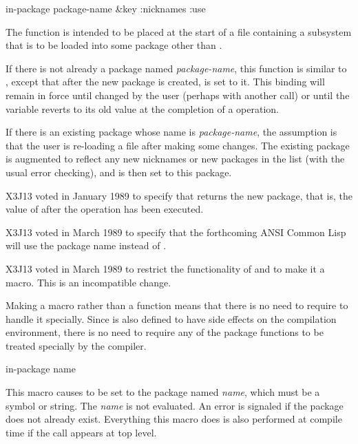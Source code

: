 \begin{obsolete}
\begin{defun}[Function]
in-package package-name &key :nicknames :use

The  function is intended to be placed at the start of a
file containing a subsystem that is to be loaded into some package other
than .

If there is not already a package named {\it package-name}, this
function is similar to , except that after the
new package is created,  is set to it.  This binding will
remain in force until changed by the user (perhaps with another
 call) or until the  variable reverts to its
old value at the completion of a  operation.

If there is an existing package whose name is {\it package-name}, the
assumption is that the user is re-loading a file after making some
changes.  The existing package is augmented to reflect any new nicknames
or new packages in the  list (with the usual error checking), and
 is then set to this package.
\end{defun}
\end{obsolete}

\begin{new}
X3J13 voted in January 1989
to specify that  returns the new package, that is, the
value of  after the operation has been executed.
\end{new}

\begin{newer}
X3J13 voted in March 1989  to specify that
the forthcoming ANSI Common Lisp will use the package name 
instead of .
\end{newer}

\begin{newer}
X3J13 voted in March 1989 
to restrict the functionality of  and to make it a macro.
This is an incompatible change.

    Making  a macro rather than a function means that there
    is no need to require  to handle it specially.  Since
     is also defined to have side
    effects on the compilation environment,
    there is no need to require any of the package functions to be treated
    specially by the compiler.

\begin{defmac}
in-package name

This macro causes  to be set to the package named {\it name},
    which must be a symbol or string.  The {\it name} is not evaluated.
    An error is signaled if the
    package does not already exist.  Everything this macro does is also
    performed at compile time if the call appears at top level.
\end{defmac}
\end{newer}


